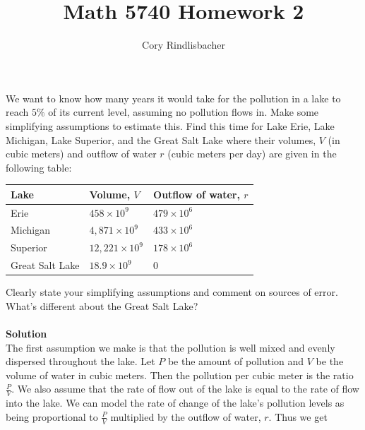 \documentclass[12pt]{article}
\newenvironment{exercise}[2][Exercise]{\begin{trivlist}
\item[\hskip \labelsep {\bfseries #1}\hskip \labelsep {\bfseries #2.}]}{\end{trivlist}}
\begin{document}
 
 
 
\title{Math 5740 Homework 2}%
\author{Cory Rindlisbacher\\ %
} %
 
\maketitle
 
\begin{exercise}{1} 
We want to know how many years it would take for the pollution in a lake to reach $5\%$ of its current level, assuming no pollution flows in. Make some simplifying assumptions to estimate this. Find this time for Lake Erie, Lake Michigan, Lake Superior, and the Great Salt Lake where their volumes, $V$ (in cubic meters) and outflow of water $r$ (cubic meters per day) are given in the following table: \\
\begin{center}
	\begin{tabular}{lll}
		Lake & Volume, $V$ & Outflow of water, $r$ \\ \hline
		Erie & $458 \times 10^9$ & $479 \times 10^6$ \\
		Michigan & $4,871 \times 10^9$ & $433 \times 10^6$ \\
		Superior & $12,221 \times 10^9$ & $178 \times 10^6$ \\
		Great Salt Lake & $18.9 \times 10^9$ & $0$ \\
	\end{tabular}
\end{center}

Clearly state your simplifying assumptions and comment on sources of error. What's different about the Great Salt Lake?
\\
\\
\textbf{Solution}\\
The first assumption we make is that the pollution is well mixed and evenly dispersed throughout the lake. Let $P$ be the amount of pollution and $V$ be the volume of water in cubic meters. Then the pollution per cubic meter is the ratio $\frac{P}{V}$. We also assume that the rate of flow out of the lake is equal to the rate of flow into the lake. We can model the rate of change of the lake's pollution levels as being proportional to $\frac{P}{V}$ multiplied by the outflow of water, $r$. Thus we get 


\end{exercise}
\end{document}
